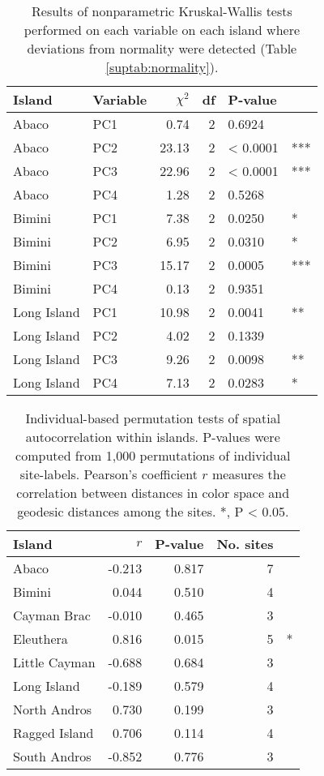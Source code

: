 \begin{table}[H]
    \caption{Results of nonparametric Kruskal-Wallis tests performed on each variable on each island where deviations from normality were detected (Table \ref{suptab:normality}).}
    \centering
    \begin{tabular}{llrrll}
        \hline
        Island & Variable & $\chi^2$ & df & P-value & \\
        \hline
        Abaco & PC1 & 0.74 & 2 & 0.6924 & \\
        Abaco & PC2 & 23.13 & 2 & < 0.0001 & ***\\
        Abaco & PC3 & 22.96 & 2 & < 0.0001 & ***\\
        Abaco & PC4 & 1.28 & 2 & 0.5268 & \\
        Bimini & PC1 & 7.38 & 2 & 0.0250 & *\\
        Bimini & PC2 & 6.95 & 2 & 0.0310 & *\\
        Bimini & PC3 & 15.17 & 2 & 0.0005 & ***\\
        Bimini & PC4 & 0.13 & 2 & 0.9351 & \\
        Long Island & PC1 & 10.98 & 2 & 0.0041 & **\\
        Long Island & PC2 & 4.02 & 2 & 0.1339 & \\
        Long Island & PC3 & 9.26 & 2 & 0.0098 & **\\
        Long Island & PC4 & 7.13 & 2 & 0.0283 & *\\
        \hline
    \end{tabular}
    \label{suptab:kruskal}
\end{table}


\begin{table}[H]
    \caption{Individual-based permutation tests of spatial autocorrelation within islands. P-values were computed from 1,000 permutations of individual site-labels. Pearson's coefficient $r$ measures the correlation between distances in color space and geodesic distances among the sites. *, P < 0.05.}
    \centering
    \begin{tabular}{lrrrl}
        \hline
        Island & $r$ & P-value & No. sites & \\
        \hline
        Abaco & -0.213 & 0.817 & 7 & \\
        Bimini & 0.044 & 0.510 & 4 & \\
        Cayman Brac & -0.010 & 0.465 & 3 & \\
        Eleuthera & 0.816 & 0.015 & 5 & *\\
        Little Cayman & -0.688 & 0.684 & 3 & \\
        Long Island & -0.189 & 0.579 & 4 & \\
        North Andros & 0.730 & 0.199 & 3 & \\
        Ragged Island & 0.706 & 0.114 & 4 & \\
        South Andros & -0.852 & 0.776 & 3 & \\
        \hline
    \end{tabular}
    \label{suptab:autocor}
\end{table}


